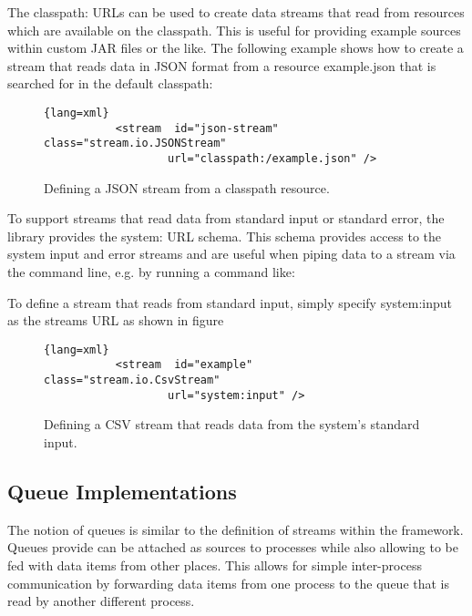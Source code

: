 The {\ttfamily classpath:} URLs can be used to create data streams
that read from resources which are available on the classpath. This is
useful for providing example sources within custom JAR files or the
like. The following example shows how to create a stream that reads
data in JSON format from a resource {\ttfamily example.json} that is
searched for in the default classpath:
\begin{figure}[h!]
        \centering
        \begin{lstlisting}{lang=xml}
           <stream  id="json-stream"  class="stream.io.JSONStream"
                   url="classpath:/example.json" />
        \end{lstlisting}
        \caption{\label{fig:jsonStreamClasspath}Defining a JSON stream from a classpath resource.}
\end{figure}

To support streams that read data from standard input or standard
error, the library provides the {\ttfamily system:} URL schema. This
schema provides access to the system input and error streams and are
useful when piping data to a stream via the command line, e.g. by
running a command like:
\begin{figure}[h!]
\end{figure}
To define a stream that reads from standard input, simply specify
{\ttfamily system:input} as the streams URL as shown in figure
\begin{figure}[h1]
        \centering
        \begin{lstlisting}{lang=xml}
           <stream  id="example"  class="stream.io.CsvStream"
                   url="system:input" />
        \end{lstlisting}
        \caption{\label{fig:csvStreamStdin}Defining a CSV stream that reads data from the system's standard input.}
\end{figure}

\newpage











\newpage
\subsection{\label{api:stream:queues}Queue Implementations}
The notion of queues is similar to the definition of streams within
the \streams framework. Queues provide can be attached as sources to
processes while also allowing to be fed with data items from other
places. This allows for simple inter-process communication by
forwarding data items from one process to the queue that is read by
another different process.



